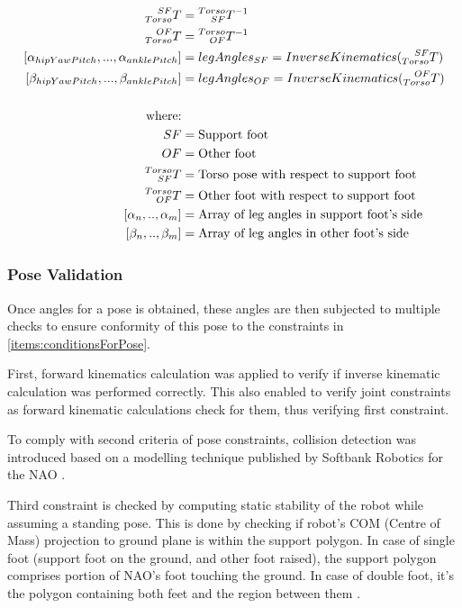 \documentclass[english, printversion, nomenclature, notitle]{tuvisionthesis} %
\begin{document}
\begin{equation}
\label{eq:pose_2_joint_generation}
\begin{aligned}
\prescript{SF}{Torso}{T} &= \prescript{Torso}{SF}{T}^{-1} \\
\prescript{OF}{Torso}{T} &= \prescript{Torso}{OF}{T}^{-1} \\
[\alpha_{hipYawPitch}, ... , \alpha_{anklePitch}] &= legAngles_{SF} = InverseKinematics(\prescript{SF}{Torso}{T}) \\
[\beta_{hipYawPitch}, ... , \beta_{anklePitch}] &= legAngles_{OF} = InverseKinematics(\prescript{OF}{Torso}{T}) \\ \\
\text{where:} \\
SF &= \text{Support foot} \\
OF &= \text{Other foot} \\
\prescript{Torso}{SF}{T} &= \text{Torso pose with respect to support foot} \\
\prescript{Torso}{OF}{T} &= \text{Other foot with respect to support foot} \\
[\alpha_n, .., \alpha_m] &= \text{Array of leg angles in support foot's side} \\
[\beta_n, .., \beta_m] &= \text{Array of leg angles in other foot's side}
\end{aligned}
\end{equation}

\subsubsection{Pose Validation}

Once angles for a pose is obtained, these angles are then subjected to multiple checks to ensure conformity of this pose to the constraints in \cref{items:conditionsForPose}. 

First, forward kinematics calculation was applied to verify if inverse kinematic calculation was performed correctly. This also enabled to verify joint constraints as forward kinematic calculations check for them, thus verifying first constraint.

To comply with second criteria of pose constraints, collision detection was introduced based on a modelling technique published by Softbank Robotics for the NAO \cite{softbank_robotics_self_collision_avoidance}.

Third constraint is checked by computing static stability of the robot while assuming a standing pose. This is done by checking if robot's COM (Centre of Mass) projection to ground plane is within the support polygon. In case of single foot (support foot on the ground, and other foot raised), the support polygon comprises portion of NAO's foot touching the ground. In case of double foot, it's the polygon containing both feet and the region between them \cite{honda-humanoid, kuffner2002dynamically}.
\end{document}
